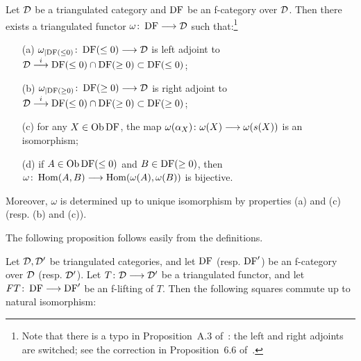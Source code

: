 \begin{proposition}
Let $\mathcal{D}$ be a triangulated category and $\operatorname{DF}$ be an f-category over $\mathcal{D}$.
Then there exists a triangulated functor $\omega\colon \operatorname{DF}\longrightarrow\mathcal{D}$ such that:\footnote{Note that there is a typo in Proposition~A.3 of~\cite{Be1}: the left and right
adjoints are switched; see the correction in Proposition~6.6 of~\cite{Schnur}.}
\begin{itemize}
\item[(a)] $\omega_{\mid\operatorname{DF}(\leq 0)}\colon \operatorname{DF}(\leq 0)\longrightarrow\mathcal{D}$ is left adjoint to $\mathcal{D}\stackrel{i}{\longrightarrow}\operatorname{DF}(\leq 0)\cap\operatorname{DF}(\geq 0)\subset\operatorname{DF}(\leq 0)$;
\item[(b)] $\omega_{\mid\operatorname{DF}(\geq 0)}\colon \operatorname{DF}(\geq 0)\longrightarrow\mathcal{D}$ is right adjoint to $\mathcal{D}\stackrel{i}{\longrightarrow}\operatorname{DF}(\leq 0)\cap\operatorname{DF}(\geq 0)\subset\operatorname{DF}(\geq 0)$;
\item[(c)] for any $X\in\operatorname{\mathrm{Ob}}\operatorname{DF}$, the map $\omega(\alpha_X)\colon \omega(X)\longrightarrow\omega(s(X))$ is an isomorphism;
\item[(d)] if $A\in\operatorname{\mathrm{Ob}}\operatorname{DF}(\leq 0)$ and $B\in\operatorname{DF}(\geq 0)$, then $\omega\colon \operatorname{Hom}(A,B)\longrightarrow\operatorname{Hom}(\omega(A),\omega(B))$ is bijective.

\end{itemize}
Moreover, $\omega$ is determined up to unique isomorphism by properties (a) and (c) (resp. (b) and (c)).

\label{prop_f_category2}
\end{proposition}

The following proposition follows easily from the definitions.

\begin{proposition}
Let $\mathcal{D},\mathcal{D}'$ be triangulated categories, and let $\operatorname{DF}$ (resp. $\operatorname{DF}'$) be an f-category over $\mathcal{D}$ (resp. $\mathcal{D}'$).
Let $T\colon \mathcal{D}\longrightarrow\mathcal{D}'$ be a triangulated functor, and let $FT\colon \operatorname{DF}\longrightarrow\operatorname{DF}'$ be an f-lifting of $T$.
Then the following squares commute up to natural isomorphism:


\label{prop_f_lifting}
\end{proposition}



